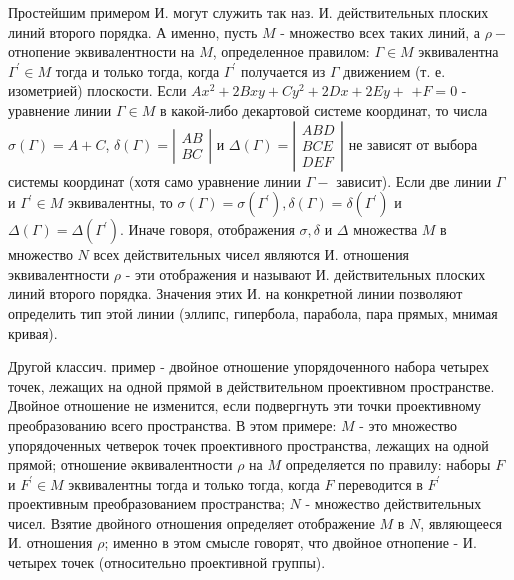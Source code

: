 \documentclass[10pt]{article}
\begin{document}
Простейшим примером И. могут служить так наз. И. действительных плоских линий второго порядка. А именно, пусть $M$ - множество всех таких линий, а $\rho-$ отнопение эквивалентности на $M$, определенное правилом: $\Gamma \in M$ эквивалентна $\Gamma^{\prime} \in M$ тогда и только тогда, когда $\Gamma^{\prime}$ получается из $\Gamma$ движением (т. е. изометрией) плоскости. Если $A x^{2}+2 B x y+C y^{2}+2 D x+2 E y+$ $+F=0$ - уравнение линии $\Gamma \in M$ в какой-либо декартовой системе координат, то числа $\sigma(\Gamma)=A+C$, $\delta(\Gamma)=\left|\begin{array}{l}A B \\ B C\end{array}\right|$ и $\Delta(\Gamma)=\left|\begin{array}{l}A B D \\ B C E \\ D E F\end{array}\right|$ не зависят от выбора системы координат (хотя само уравнение линии $\Gamma-$ зависит). Если две линии $\Gamma$ и $\Gamma^{\prime} \in M$ эквивалентны, то $\sigma(\Gamma)=\sigma\left(\Gamma^{\prime}\right), \delta(\Gamma)=\delta\left(\Gamma^{\prime}\right)$ и $\Delta(\Gamma)=\Delta\left(\Gamma^{\prime}\right)$. Иначе говоря, отображения $\sigma, \delta$ и $\Delta$ множества $M$ в множество $N$ всех действительных чисел являются И. отношения эквивалентности $\rho$ - эти отображения и называют И. действительных плоских линий второго порядка. Значения этих И. на конкретной линии позволяют определить тип этой линии (эллипс, гипербола, парабола, пара прямых, мнимая кривая).



Другой классич. пример - двойное отношение упорядоченного набора четырех точек, лежащих на одной прямой в действительном проективном пространстве. Двойное отношение не изменится, если подвергнуть эти точки проективному преобразованию всего пространства. В этом примере: $M$ - это множество упорядоченных четверок точек проективного пространства, лежащих на одной прямой; отношение әквивалентности $\rho$ на $M$ определяется по правилу: наборы $F$ и $F^{\prime} \in M$ эквивалентны тогда и только тогда, когда $F$ переводится в $F^{\prime}$ проективным преобразованием пространства; $N$ - множество действительных чисел. Взятие двойного отношения определяет отображение $M$ в $N$, являющееся И. отношения $\rho$; именно в этом смысле говорят, что двойное отнопение - И. четырех точек (относительно проективной группы).
\end{document}
